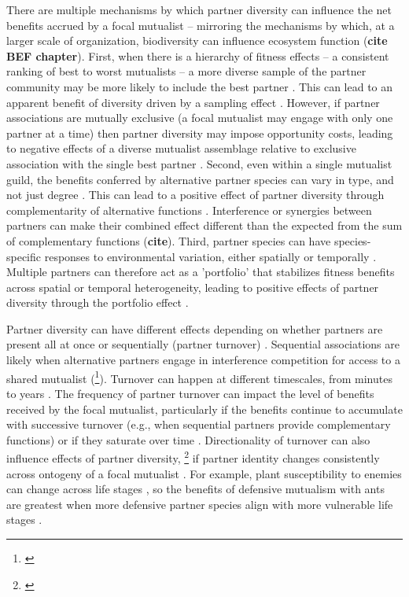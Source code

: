 \documentclass[11pt]{article}
\newcommand{\tom}[2]{{\color{red}{#1}}\footnote{\textit{\color{red}{#2}}}}
\begin{document}
There are multiple mechanisms by which partner diversity can influence the net benefits accrued by a focal mutualist -- mirroring the mechanisms by which, at a larger scale of organization, biodiversity can influence ecosystem function (\textbf{cite BEF chapter}). 
First, when there is a hierarchy of fitness effects -- a consistent ranking of best to worst mutualists -- a more diverse sample of the partner community may be more likely to include the best partner \cite{Frederickson2013}.
This can lead to an apparent benefit of diversity driven by a sampling effect \cite{Batstone2018}. 
However, if partner associations are mutually exclusive (a focal mutualist may engage with only one partner at a time) then partner diversity may impose opportunity costs, leading to negative effects of a diverse mutualist assemblage relative to exclusive association with the single best partner \citep{Miller2007}. 
Second, even within a single mutualist guild, the benefits conferred by alternative partner species can vary in type, and not just degree \cite{Stachowicz2005,Bronstein2006,Stanton2003}. 
This can lead to a positive effect of partner diversity through complementarity of alternative functions \cite{Batstone2018}. 
Interference or synergies between partners can make their combined effect different than the expected from the sum of complementary functions (\textbf{cite}). 
Third, partner species can have species-specific responses to environmental variation, either spatially \citep{Ollerton2006} or temporally \citep{Alarcon2008}. 
Multiple partners can therefore act as a 'portfolio' that stabilizes fitness benefits across spatial or temporal heterogeneity, leading to positive effects of partner diversity through the portfolio effect \cite{Batstone2018,Lazaro2022}. 

Partner diversity can have different effects depending on whether partners are present all at once or sequentially (partner turnover) \citep{Djieto-Lordon2005, Ness2006, Bruna2014}. 
Sequential associations are likely when alternative partners engage in interference competition for access to a shared mutualist (\tom{cite examples, including non-ant-plant examples}{Flagging this.}). 
Turnover can happen at different timescales, from minutes to years \citep{Oliveira1999,Horvitz1986}. 
The frequency of partner turnover can impact the level of benefits received by the focal mutualist, particularly if the benefits continue to accumulate with successive turnover (e.g., when sequential partners provide complementary functions) or if they saturate over time \citep{Sachs2004}.
Directionality of turnover can also influence effects of partner diversity, \tom{particularly}{Two `particularly' sentences in a row.} if partner identity changes consistently across ontogeny of a focal mutualist \citep{Fonseca2003}.
For example, plant susceptibility to enemies can change across life stages \citep{Boege2005,Barton2010}, so the benefits of defensive mutualism with ants are greatest when more defensive partner species align with more vulnerable life stages \citep{Djieto-Lordon2005}.
\end{document}
